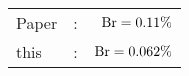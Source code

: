       \begin{tabular}{lcr}
          Paper &:& $\mathrm{Br}  = 0.11\%$ \\
          this      &:& $\mathrm{Br}  = 0.062\%$ \\        
      \end{tabular}

